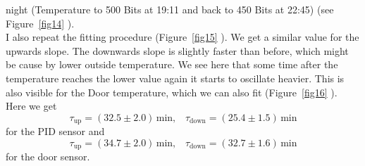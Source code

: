 \documentclass[12pt]{scrartcl}
\begin{document}
      night (Temperature to 500 Bits at 19:11 and back to 450 Bits at 22:45)
      (see Figure~\ref{fig14} ). \\ I also repeat the fitting procedure
      (Figure~\ref{fig15} ). We get a similar value for the upwards slope. The
      downwards slope is slightly faster than before, which might be cause by
      lower outside temperature. We see here that some time after the
      temperature reaches the lower value again it starts to oscillate heavier.
      This is also visible for the Door temperature, which we can also fit
      (Figure~\ref{fig16} ). \\
      Here we get
      $$\tau_{\text{up}} = (32.5 \pm 2.0)\,\text{min}, \;\;\; \tau_{\text{down}} =
      (25.4 \pm 1.5) \,\text{min}$$
      for the PID sensor and
      $$\tau_{\text{up}} = (34.7 \pm 2.0) \,\text{min}, \;\;\;
      \tau_{\text{down}} = (32.7 \pm 1.6) \,\text{min}$$
      for the door sensor.
\end{document}
